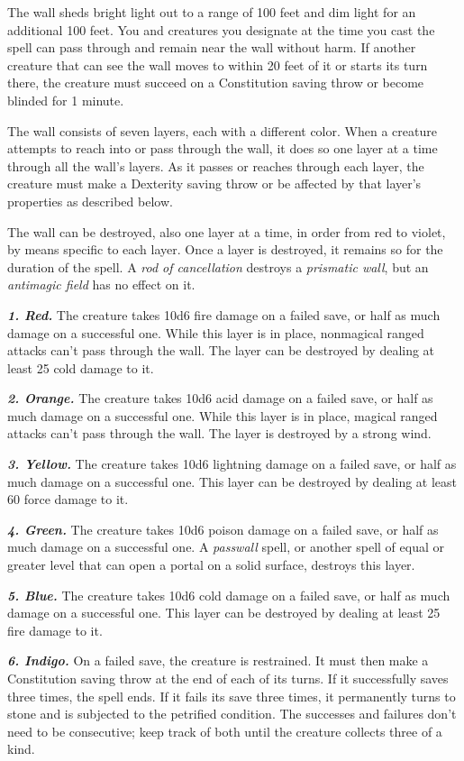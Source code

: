 \documentclass[
]{article}
\begin{document}
The wall sheds bright light out to a range of 100 feet and dim light for
an additional 100 feet. You and creatures you designate at the time you
cast the spell can pass through and remain near the wall without harm.
If another creature that can see the wall moves to within 20 feet of it
or starts its turn there, the creature must succeed on a Constitution
saving throw or become blinded for 1 minute.

The wall consists of seven layers, each with a different color. When a
creature attempts to reach into or pass through the wall, it does so one
layer at a time through all the wall's layers. As it passes or reaches
through each layer, the creature must make a Dexterity saving throw or
be affected by that layer's properties as described below.

The wall can be destroyed, also one layer at a time, in order from red
to violet, by means specific to each layer. Once a layer is destroyed,
it remains so for the duration of the spell. A \emph{rod of
cancellation} destroys a \emph{prismatic wall}, but an \emph{antimagic
field} has no effect on it.

\emph{\textbf{1. Red.}} The creature takes 10d6 fire damage on a failed
save, or half as much damage on a successful one. While this layer is in
place, nonmagical ranged attacks can't pass through the wall. The layer
can be destroyed by dealing at least 25 cold damage to it.

\emph{\textbf{2. Orange.}} The creature takes 10d6 acid damage on a
failed save, or half as much damage on a successful one. While this
layer is in place, magical ranged attacks can't pass through the wall.
The layer is destroyed by a strong wind.

\emph{\textbf{3. Yellow.}} The creature takes 10d6 lightning damage on a
failed save, or half as much damage on a successful one. This layer can
be destroyed by dealing at least 60 force damage to it.

\emph{\textbf{4. Green.}} The creature takes 10d6 poison damage on a
failed save, or half as much damage on a successful one. A
\emph{passwall} spell, or another spell of equal or greater level that
can open a portal on a solid surface, destroys this layer.

\emph{\textbf{5. Blue.}} The creature takes 10d6 cold damage on a failed
save, or half as much damage on a successful one. This layer can be
destroyed by dealing at least 25 fire damage to it.

\emph{\textbf{6. Indigo.}} On a failed save, the creature is restrained.
It must then make a Constitution saving throw at the end of each of its
turns. If it successfully saves three times, the spell ends. If it fails
its save three times, it permanently turns to stone and is subjected to
the petrified condition. The successes and failures don't need to be
consecutive; keep track of both until the creature collects three of a
kind.
\end{document}
